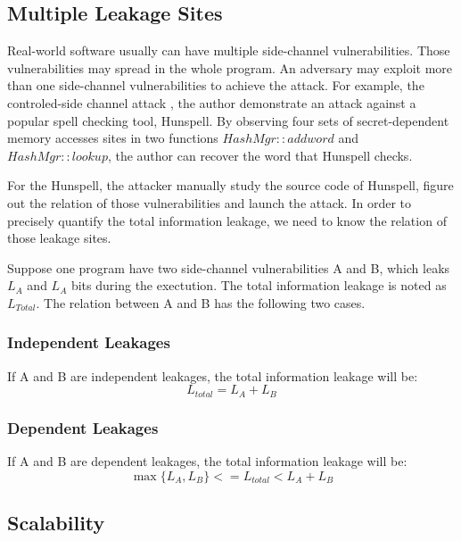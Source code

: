 \subsection{Multiple Leakage Sites}
Real-world software usually can have multiple side-channel vulnerabilities. Those vulnerabilities 
may spread in the whole program. An adversary may exploit more than one side-channel vulnerabilities 
to achieve the attack. For example, the controled-side channel attack \cite{7163052} \cite{191010}, the author 
demonstrate an attack against a popular spell checking tool, Hunspell. By observing four sets 
of secret-dependent memory accesses sites in two functions $HashMgr::addword$ and $HashMgr::lookup$, 
the author can recover the word that Hunspell checks.

For the Hunspell, the attacker manually study the source code of Hunspell, figure out
the relation of those vulnerabilities and launch the attack. In order to precisely quantify the
total information leakage, we need to know the relation of those leakage sites. 

Suppose one program have two side-channel vulnerabilities A and B, which leaks $L_A$ and $L_A$ bits
during the exectution. The total information leakage is noted as $L_{Total}$. The relation between
A and B has the following two cases.

\subsubsection{Independent Leakages}
If A and B are independent leakages, the total information leakage will be:
\begin{equation}
\label{independent leakage}
    L_{total} = L_A + L_B
\end{equation} 

\subsubsection{Dependent Leakages}
If A and B are dependent leakages, the total information leakage will be:
\begin{equation}
\label{independent leakage}
    \max{\{L_A, L_B\}}  <= L_{total} < L_A + L_B
\end{equation}

\subsection{Scalability}



